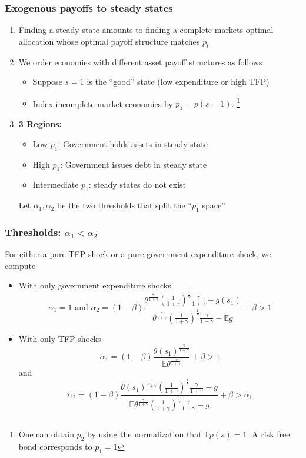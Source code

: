 \documentclass{beamer}
\newcommand{\EE}{\mathbb E}
\begin{document}
 \begin{frame}
  \frametitle{Exogenous payoffs to steady states}
  \begin{enumerate}
   \item Finding a steady state amounts to finding a complete markets optimal allocation whose optimal payoff structure matches $p_t$
  \item We order  economies with different asset payoff structures as follows
  \begin{itemize}
   \item  Suppose $s=1$ is the ``good'' state (low expenditure or high TFP)
   \item Index incomplete market economies by $p_1=p(s=1)$. \footnote{ One can obtain $p_2$ by using the normalization that $\mathbb{E}p(s)=1$. A risk free bond corresponds to $p_1=1$}
    \end{itemize}
  \item \textbf{3 Regions: }
  \begin{itemize}
   \item Low $p_1$: Government holds assets in steady state
   \item High $p_1$: Government  issues debt  in steady state
   \item Intermediate $p_1$: steady states do not exist
  \end{itemize}
Let $\alpha_1,\alpha_2$ be the two thresholds   that split the ``$p_1$ space''
  \end{enumerate}

 \end{frame}

\begin{frame}
 \frametitle{Thresholds: $\alpha_1 <\alpha_2$}
	For either a pure TFP shock or a pure government expenditure shock,  we compute %
	\begin{itemize}
		\item With only government expenditure shocks
		\[
			\alpha_1 = 1 \text{  and }  \alpha_2 = (1-\beta)\frac{\theta^\frac{\gamma}{1+\gamma}\left(\frac{1}{1+\gamma}\right)^\frac1\gamma\frac{\gamma}{1+\gamma}-g(s_1)}{\theta^\frac{\gamma}{1+\gamma}\left(\frac{1}{1+\gamma}\right)^\frac1\gamma\frac{\gamma}{1+\gamma}-\EE g} +\beta>1
		\]
		\item With only TFP shocks
		\[
			\alpha_1 = (1-\beta)\frac{\theta(s_1)^\frac{\gamma}{1+\gamma}}{\EE\theta^\frac{\gamma}{1+\gamma}}+\beta > 1
		\]and
		\[
		\alpha_2 = (1-\beta)\frac{\theta(s_1)^\frac{\gamma}{1+\gamma}\left(\frac{1}{1+\gamma}\right)^\frac1\gamma\frac{\gamma}{1+\gamma}-g}{\EE\theta^\frac{\gamma}{1+\gamma}\left(\frac{1}{1+\gamma}\right)^\frac1\gamma\frac{\gamma}{1+\gamma}-g}+\beta>\alpha_1
		\]
	\end{itemize}
 \end{frame}
\end{document}
